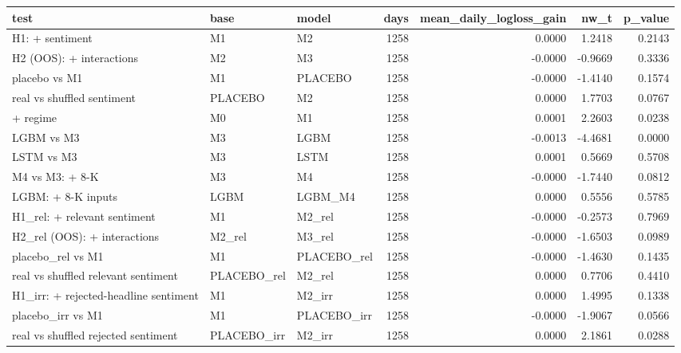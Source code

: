 \begin{tabular}{lllrrrr}
\toprule
test & base & model & days & mean\_daily\_logloss\_gain & nw\_t & p\_value \\
\midrule
H1: + sentiment & M1 & M2 & 1258 & 0.0000 & 1.2418 & 0.2143 \\
H2 (OOS): + interactions & M2 & M3 & 1258 & -0.0000 & -0.9669 & 0.3336 \\
placebo vs M1 & M1 & PLACEBO & 1258 & -0.0000 & -1.4140 & 0.1574 \\
real vs shuffled sentiment & PLACEBO & M2 & 1258 & 0.0000 & 1.7703 & 0.0767 \\
+ regime & M0 & M1 & 1258 & 0.0001 & 2.2603 & 0.0238 \\
LGBM vs M3 & M3 & LGBM & 1258 & -0.0013 & -4.4681 & 0.0000 \\
LSTM vs M3 & M3 & LSTM & 1258 & 0.0001 & 0.5669 & 0.5708 \\
M4 vs M3: + 8-K & M3 & M4 & 1258 & -0.0000 & -1.7440 & 0.0812 \\
LGBM: + 8-K inputs & LGBM & LGBM\_M4 & 1258 & 0.0000 & 0.5556 & 0.5785 \\
H1\_rel: + relevant sentiment & M1 & M2\_rel & 1258 & -0.0000 & -0.2573 & 0.7969 \\
H2\_rel (OOS): + interactions & M2\_rel & M3\_rel & 1258 & -0.0000 & -1.6503 & 0.0989 \\
placebo\_rel vs M1 & M1 & PLACEBO\_rel & 1258 & -0.0000 & -1.4630 & 0.1435 \\
real vs shuffled relevant sentiment & PLACEBO\_rel & M2\_rel & 1258 & 0.0000 & 0.7706 & 0.4410 \\
H1\_irr: + rejected-headline sentiment & M1 & M2\_irr & 1258 & 0.0000 & 1.4995 & 0.1338 \\
placebo\_irr vs M1 & M1 & PLACEBO\_irr & 1258 & -0.0000 & -1.9067 & 0.0566 \\
real vs shuffled rejected sentiment & PLACEBO\_irr & M2\_irr & 1258 & 0.0000 & 2.1861 & 0.0288 \\
\bottomrule
\end{tabular}
